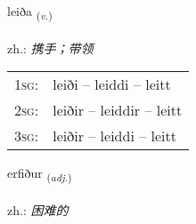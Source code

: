\documentclass[frontgrid, backgrid]{flacards}\usepackage[]{graphicx}\usepackage[]{xcolor}
\begin{document}
\renewcommand{\flhead}{\vskip5pt \fboxsep=0pt {\small\bfseries\footnotesize Sagnorð | 动词}}
\renewcommand{\fcfoot}{\vskip5pt \fboxsep=0pt \hspace{2pt}{\small\bfseries\footnotesize 1K}}

\renewcommand{\blhead}{\vskip5pt {\small\bfseries\footnotesize Sagnorð | 动词 }}
\renewcommand{\bcfoot}{\vskip5pt \hspace{2pt}{\small\bfseries\footnotesize 1K}}


{leiða \small{\textsubscript{(\textit{v.})}} \\[1ex] %
\textphonetic{[leiːða]} \\
zh.: \emph{携手；带领} \\  [2ex]
\renewcommand*{\arraystretch}{0.8}
\begin{tabular}{p{1cm}l}
\textsc{1sg}: & leiði -- leiddi -- leitt \\ 
\textsc{2sg}: & leiðir -- leiddir -- leitt \\ 
\textsc{3sg}: & leiðir -- leiddi -- leitt \\ 
\end{tabular}
}

\renewcommand{\flhead}{\vskip5pt \fboxsep=0pt {\small\bfseries\footnotesize Lýsingarorð | 形容词}}
\renewcommand{\fcfoot}{\vskip5pt \fboxsep=0pt \hspace{2pt}{\small\bfseries\footnotesize 1K}}

\renewcommand{\blhead}{\vskip5pt {\small\bfseries\footnotesize Lýsingarorð | 形容词 }}
\renewcommand{\bcfoot}{\vskip5pt \hspace{2pt}{\small\bfseries\footnotesize 1K}}


{erfiður \small{\textsubscript{(\textit{adj.})}} \\[1ex] %
\textphonetic{[ɛrvɪðʏr]} \\
zh.: \emph{困难的} \\  [2ex]
\renewcommand*{\arraystretch}{0.8}
}
\end{document}
